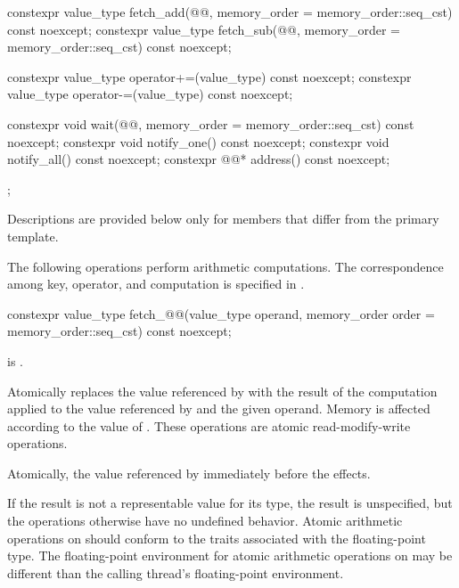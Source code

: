 \begin{codeblock}
{{    constexpr value_type fetch_add(@@,
                                  memory_order = memory_order::seq_cst) const noexcept;
    constexpr value_type fetch_sub(@@,
                                  memory_order = memory_order::seq_cst) const noexcept;

    constexpr value_type operator+=(value_type) const noexcept;
    constexpr value_type operator-=(value_type) const noexcept;

    constexpr void wait(@@,
                        memory_order = memory_order::seq_cst) const noexcept;
    constexpr void notify_one() const noexcept;
    constexpr void notify_all() const noexcept;
    constexpr @@* address() const noexcept;
  };
}
\end{codeblock}

\pnum
Descriptions are provided below only for members
that differ from the primary template.

\pnum
The following operations perform arithmetic computations.
The correspondence among key, operator, and computation is specified
in .

%
%
\begin{itemdecl}
constexpr value_type fetch_@@(value_type operand,
                          memory_order order = memory_order::seq_cst) const noexcept;
\end{itemdecl}

\begin{itemdescr}
\pnum
\constraints
{} is .

\pnum
\effects
Atomically replaces the value referenced by  with
the result of the computation applied to the value referenced by 
and the given operand.
Memory is affected according to the value of .
These operations are atomic read-modify-write operations.

\pnum
\returns
Atomically, the value referenced by 
immediately before the effects.

\pnum
\remarks
If the result is not a representable value for its type,
the result is unspecified,
but the operations otherwise have no undefined behavior.
Atomic arithmetic operations on  should conform to
the  traits
associated with the floating-point type.
The floating-point environment
for atomic arithmetic operations on 
may be different than the calling thread's floating-point environment.
\end{itemdescr}

